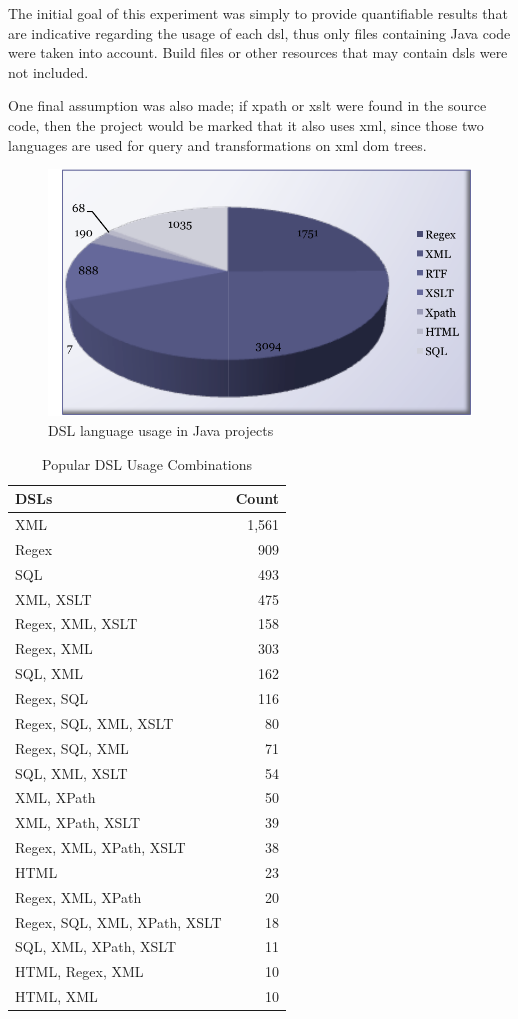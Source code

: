 \documentclass{sig-alternate}
\begin{document}
The initial goal of this experiment was simply to provide quantifiable results that are indicative regarding the usage of each {\sc dsl}, thus only files containing Java code were taken into account. Build files or other resources that may contain {\sc dsl}s were not included.

One final assumption was also made; if {\sc xpath} or {\sc xslt} were found in the source code, then the project would be marked that it also uses {\sc xml}, since those two languages are used for query and transformations on {\sc xml} {\sc dom} trees.

\begin{figure}
\centering
\includegraphics[scale=0.65]{dsl-usage}
\caption{DSL language usage in Java projects}
\label{fig:dsl-usage}
\end{figure}

\begin{table}
\centering
\caption{Popular DSL Usage Combinations}
\label{tbl:dsl-top-usage}
\begin{tabular}{l r}
 \hline
\textbf{DSLs} & \textbf{Count}\\
\hline
XML & 1,561\\
Regex & 909\\
SQL & 493\\
XML, XSLT & 475\\
Regex, XML, XSLT & 158\\
Regex, XML & 303\\
SQL, XML & 162\\
Regex, SQL & 116\\
Regex, SQL, XML, XSLT & 80\\
Regex, SQL, XML & 71\\
SQL, XML, XSLT & 54\\
XML, XPath & 50\\
XML, XPath, XSLT & 39\\
Regex, XML, XPath, XSLT & 38\\
HTML & 23\\
Regex, XML, XPath & 20\\
Regex, SQL, XML, XPath, XSLT & 18\\
SQL, XML, XPath, XSLT & 11\\
HTML, Regex, XML & 10\\
HTML, XML & 10\\
\hline
\end{tabular}
\end{table}
\end{document}

